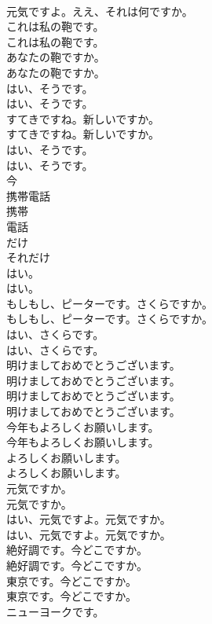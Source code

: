 \documentclass[8pt]{extreport}
\begin{document}
\begin{CJK}{UTF8}{min}
\\	元気ですよ。ええ、それは何ですか。 
\\	これは私の鞄です。	
\\	これは私の鞄です。 
\\	あなたの鞄ですか。	
\\	あなたの鞄ですか。 
\\	はい、そうです。	
\\	はい、そうです。 
\\	すてきですね。新しいですか。	
\\	すてきですね。新しいですか。 
\\	はい、そうです。	
\\	はい、そうです。 
\\	今
\\	携帯電話
\\	携帯
\\	電話
\\	だけ
\\	それだけ
\\	はい。	
\\	はい。 
\\	もしもし、ピーターです。さくらですか。	
\\	もしもし、ピーターです。さくらですか。 
\\	はい、さくらです。	
\\	はい、さくらです。 
\\	明けましておめでとうございます。	
\\	明けましておめでとうございます。 
\\	明けましておめでとうございます。	
\\	明けましておめでとうございます。 
\\	今年もよろしくお願いします。	
\\	今年もよろしくお願いします。 
\\	よろしくお願いします。	
\\	よろしくお願いします。 
\\	元気ですか。	
\\	元気ですか。 
\\	はい、元気ですよ。元気ですか。	
\\	はい、元気ですよ。元気ですか。 
\\	絶好調です。今どこですか。	
\\	絶好調です。今どこですか。 
\\	東京です。今どこですか。	
\\	東京です。今どこですか。 
\\	ニューヨークです。	

\end{CJK}
\end{document}
